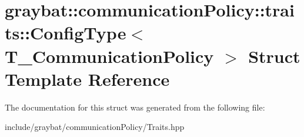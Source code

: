 \hypertarget{structgraybat_1_1communicationPolicy_1_1traits_1_1ConfigType}{}\section{graybat\+:\+:communication\+Policy\+:\+:traits\+:\+:Config\+Type$<$ T\+\_\+\+Communication\+Policy $>$ Struct Template Reference}
\label{structgraybat_1_1communicationPolicy_1_1traits_1_1ConfigType}


The documentation for this struct was generated from the following file\+:\begin{DoxyCompactItemize}
\item 
include/graybat/communication\+Policy/Traits.\+hpp\end{DoxyCompactItemize}
